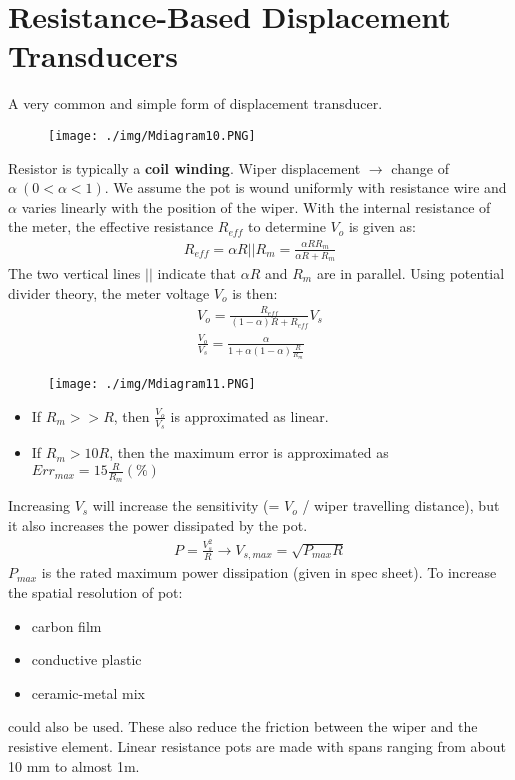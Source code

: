 \section{Resistance-Based Displacement Transducers}
A very common and simple form of displacement transducer.
\begin{figure}[H]
  \centering
  \texttt{[image: ./img/Mdiagram10.PNG]}
\end{figure}
Resistor is typically a \textbf{coil winding}. Wiper displacement $\rightarrow$ change of $\alpha \ (0<\alpha<1)$. We assume the pot is wound uniformly with resistance wire and $\alpha$ varies linearly with the position of the wiper. With the internal resistance of the meter, the effective resistance $R_{eff}$ to determine $V_o$ is given as:
\begin{gather}
  R_{eff} = \alpha R || R_m = \frac{\alpha RR_m}{\alpha R+R_m}
\end{gather}
The two vertical lines $||$ indicate that $\alpha R$ and $R_m$ are in parallel. Using potential divider theory, the meter voltage $V_o$ is then:
\begin{gather}
  V_o = \frac{R_{eff}}{(1-\alpha)R+R_{eff}}V_s \\
  \frac{V_o}{V_s} = \frac{\alpha}{1+\alpha(1-\alpha)\frac{R}{R_m}}
\end{gather}
\begin{figure}[H]
  \centering
  \texttt{[image: ./img/Mdiagram11.PNG]}
\end{figure}
\begin{itemize}
  \item If $R_m>>R$, then $\frac{V_o}{V_s}$ is approximated as linear.
  \item If $R_m>10R$, then the maximum error is approximated as $Err_{max} = 15\frac{R}{R_m}(\%)$
\end{itemize}
Increasing $V_s$ will increase the sensitivity (= $V_o$ / wiper travelling distance), but it also increases the power dissipated by the pot.
\begin{gather}
  P = \frac{V_s^2}{R} \longrightarrow V_{s,max} = \sqrt{P_{max}R}
\end{gather}
$P_{max}$ is the rated maximum power dissipation (given in spec sheet). To increase the spatial resolution of pot:
\begin{itemize}
  \item carbon film
  \item conductive plastic
  \item ceramic-metal mix
\end{itemize}
could also be used. These also reduce the friction between the wiper and the resistive element. Linear resistance pots are made with spans ranging from about 10 mm to almost 1m.
